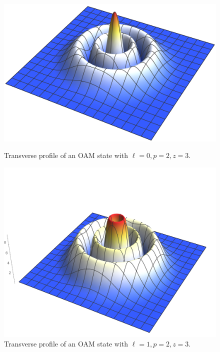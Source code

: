 

\begin{figure}
    \centering
    \begin{minipage}{0.45\textwidth}
        \centering
        \includegraphics[width=1\textwidth]{Figures/OAM/LGBeamProfile_L0P2Z03.png} %
        \caption{Transverse profile of an OAM state with $\ell=0, p=2, z=3$.}
        \label{fig:expQWs:gaussian_profile_L0P2Z03}
    \end{minipage}\hfill
    \begin{minipage}{0.45\textwidth}
        \centering
        \includegraphics[width=1\textwidth]{Figures/OAM/LGBeamProfile_L1P2Z03.png} %
        \caption{Transverse profile of an OAM state with $\ell=1, p=2, z=3$.}
        \label{fig:expQWs:gaussian_profile_L1P2Z03}
    \end{minipage}
\end{figure}

